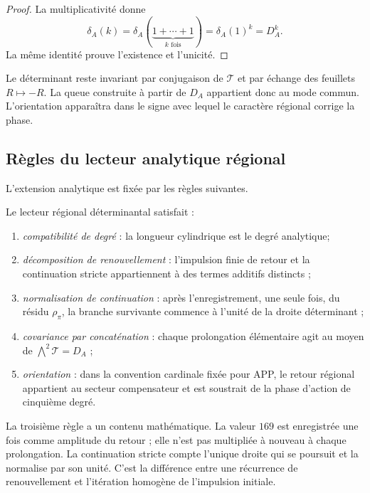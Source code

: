 \begin{proof}
La multiplicativité donne
\[
\delta_A(k)
=\delta_A(\underbrace{1+\cdots+1}_{k\text{ fois}})
=\delta_A(1)^k=D_A^k.
\]
La même identité prouve l'existence et l'unicité.
\end{proof}

Le déterminant reste invariant par conjugaison de \(\mathcal T\) et par échange des feuillets \(R\mapsto-R\). La queue construite à partir de \(D_A\) appartient donc au mode commun. L'orientation apparaîtra dans le signe avec lequel le caractère régional corrige la phase.

\subsection{Règles du lecteur analytique régional}

L'extension analytique est fixée par les règles suivantes.

\begin{definition}
\label{p12-83-c13-s3:def:lector-regional-determinantal}
Le lecteur régional déterminantal satisfait :
\begin{enumerate}
  \item \emph{compatibilité de degré} : la longueur cylindrique est le degré
  analytique;
  \item \emph{décomposition de renouvellement} : l'impulsion finie de retour et
  la continuation stricte appartiennent à des termes additifs distincts ;
  \item \emph{normalisation de continuation} : après l'enregistrement, une seule
  fois, du résidu \(\rho_\pi\), la branche survivante commence à l'unité de
  la droite déterminant ;
  \item \emph{covariance par concaténation} : chaque prolongation élémentaire
  agit au moyen de
  \(\bigwedge^2\mathcal T=D_A\) ;
  \item \emph{orientation} : dans la convention cardinale fixée pour APP, le retour régional appartient au secteur compensateur et est soustrait de la phase d'action de cinquième degré.
\end{enumerate}
\end{definition}

La troisième règle a un contenu mathématique. La valeur \(169\) est enregistrée
une fois comme amplitude du retour ; elle n'est pas multipliée à nouveau à chaque
prolongation. La continuation stricte compte l'unique droite qui se poursuit et
la normalise par son unité. C'est la différence entre une récurrence de
renouvellement et l'itération homogène de l'impulsion initiale.

